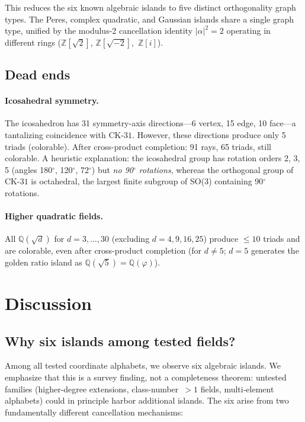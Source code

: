 \documentclass[12pt,a4paper]{article}
\newcommand{\Z}{\mathbb{Z}}
\newcommand{\Q}{\mathbb{Q}}
\newcommand{\CK}{\mathrm{CK}\text{-}31}
\begin{document}
This reduces the six known algebraic islands to five distinct orthogonality graph types. The Peres, complex quadratic, and Gaussian islands share a single graph type, unified by the modulus-2 cancellation identity $|\alpha|^2 = 2$ operating in different rings ($\Z[\sqrt{2}]$, $\Z[\sqrt{-2}]$,~$\Z[i]$).

\subsection{Dead ends}

\paragraph{Icosahedral symmetry.} The icosahedron has 31 symmetry-axis directions---6 vertex, 15 edge, 10 face---a tantalizing coincidence with $\CK$. However, these directions produce only 5 triads (colorable). After cross-product completion: 91 rays, 65 triads, still colorable. A heuristic explanation: the icosahedral group has rotation orders 2, 3, 5 (angles 180$^\circ$, 120$^\circ$, 72$^\circ$) but \emph{no 90$^\circ$ rotations}, whereas the orthogonal group of $\CK$ is octahedral, the largest finite subgroup of SO(3) containing 90$^\circ$ rotations.

\paragraph{Higher quadratic fields.} All $\Q(\sqrt{d})$ for $d = 3, \ldots, 30$ (excluding $d = 4, 9, 16, 25$) produce $\leq 10$ triads and are colorable, even after cross-product completion (for $d \neq 5$; $d = 5$ generates the golden ratio island as $\Q(\sqrt{5}) = \Q(\varphi)$).

\section{Discussion}\label{sec:discussion}

\subsection{Why six islands among tested fields?}

Among all tested coordinate alphabets, we observe six algebraic islands.  We emphasize that this is a survey finding, not a completeness theorem: untested families (higher-degree extensions, class-number~$> 1$ fields, multi-element alphabets) could in principle harbor additional islands.  The six arise from two fundamentally different cancellation mechanisms:
\end{document}
